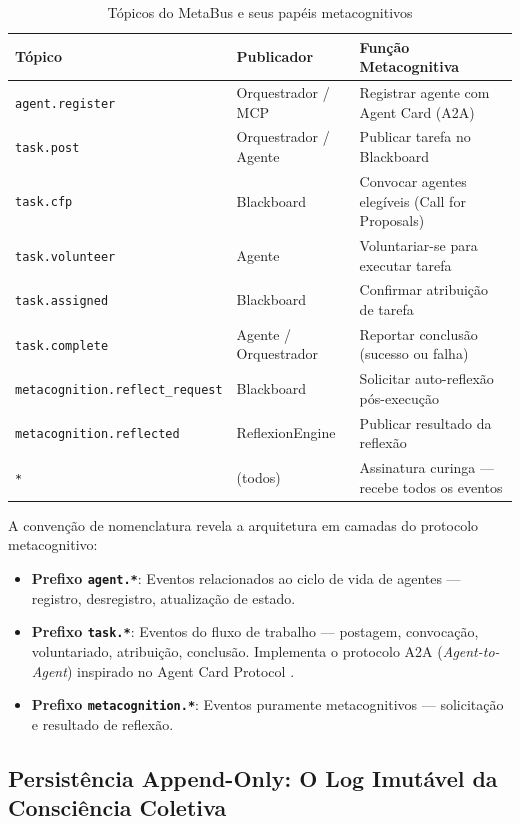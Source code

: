 \begin{table}[htbp]
\centering
\caption{Tópicos do MetaBus e seus papéis metacognitivos}
\label{tab:topicos-metabus}
\begin{tabular}{@{}p{4.5cm}p{3cm}p{6.5cm}@{}}
\toprule
\textbf{Tópico} & \textbf{Publicador} & \textbf{Função Metacognitiva} \\
\midrule
\texttt{agent.register} & Orquestrador / MCP & Registrar agente com Agent Card (A2A) \\
\texttt{task.post} & Orquestrador / Agente & Publicar tarefa no Blackboard \\
\texttt{task.cfp} & Blackboard & Convocar agentes elegíveis (Call for Proposals) \\
\texttt{task.volunteer} & Agente & Voluntariar-se para executar tarefa \\
\texttt{task.assigned} & Blackboard & Confirmar atribuição de tarefa \\
\texttt{task.complete} & Agente / Orquestrador & Reportar conclusão (sucesso ou falha) \\
\texttt{metacognition.reflect\_request} & Blackboard & Solicitar auto-reflexão pós-execução \\
\texttt{metacognition.reflected} & ReflexionEngine & Publicar resultado da reflexão \\
\texttt{*} & (todos) & Assinatura curinga — recebe todos os eventos \\
\bottomrule
\end{tabular}
\end{table}

A convenção de nomenclatura revela a arquitetura em camadas do protocolo metacognitivo:

\begin{itemize}
    \item \textbf{Prefixo \texttt{agent.*}}: Eventos relacionados ao ciclo de vida de agentes — registro, desregistro, atualização de estado.
    \item \textbf{Prefixo \texttt{task.*}}: Eventos do fluxo de trabalho — postagem, convocação, voluntariado, atribuição, conclusão. Implementa o protocolo A2A (\textit{Agent-to-Agent}) inspirado no Agent Card Protocol \cite{Google2025_A2A}.
    \item \textbf{Prefixo \texttt{metacognition.*}}: Eventos puramente metacognitivos — solicitação e resultado de reflexão.
\end{itemize}

\subsection{Persistência Append-Only: O Log Imutável da Consciência Coletiva}

